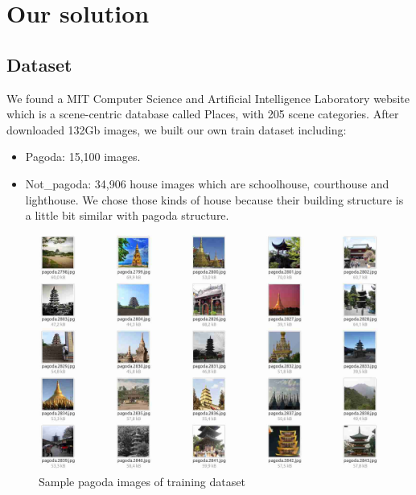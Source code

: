 \documentclass[12pt,a4paper]{article}
\begin{document}
\section{Our solution}
\subsection{Dataset}
We found a MIT Computer Science and Artificial Intelligence Laboratory website \cite{mit} which is a scene-centric database called Places, with 205 scene categories. After downloaded 132Gb images, we built our own train dataset including:
\begin{itemize}
\item Pagoda: 15,100 images.
\item Not\_pagoda: 34,906 house images which are schoolhouse, courthouse and lighthouse. We chose those kinds of house because their building structure is a little bit similar with pagoda structure.
\end{itemize}

\begin{figure}[H]
\centering
\includegraphics[width=1\textwidth]{images/sample.jpg}
\caption{Sample pagoda images of training dataset}
\label{fig:samplepagoda}
\end{figure}
\end{document}
